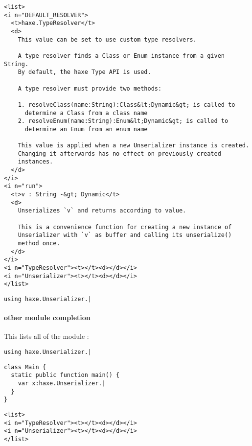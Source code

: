 \begin{lstlisting}
<list>
<i n="DEFAULT_RESOLVER">
  <t>haxe.TypeResolver</t>
  <d>
    This value can be set to use custom type resolvers.

    A type resolver finds a Class or Enum instance from a given String.
    By default, the haxe Type API is used.

    A type resolver must provide two methods:

    1. resolveClass(name:String):Class&lt;Dynamic&gt; is called to
      determine a Class from a class name
    2. resolveEnum(name:String):Enum&lt;Dynamic&gt; is called to
      determine an Enum from an enum name

    This value is applied when a new Unserializer instance is created.
    Changing it afterwards has no effect on previously created
    instances.
  </d>
</i>
<i n="run">
  <t>v : String -&gt; Dynamic</t>
  <d>
    Unserializes `v` and returns according to value.

    This is a convenience function for creating a new instance of
    Unserializer with `v` as buffer and calling its unserialize()
    method once.
  </d>
</i>
<i n="TypeResolver"><t></t><d></d></i>
<i n="Unserializer"><t></t><d></d></i>
</list>
\end{lstlisting}


\begin{lstlisting}
using haxe.Unserializer.|
\end{lstlisting}


\paragraph{other module completion}

This lists all  of the module :

\begin{lstlisting}
using haxe.Unserializer.|
\end{lstlisting}

\begin{lstlisting}
class Main {
  static public function main() {
    var x:haxe.Unserializer.|
  }
}
\end{lstlisting}

\begin{lstlisting}
<list>
<i n="TypeResolver"><t></t><d></d></i>
<i n="Unserializer"><t></t><d></d></i>
</list>
\end{lstlisting}


